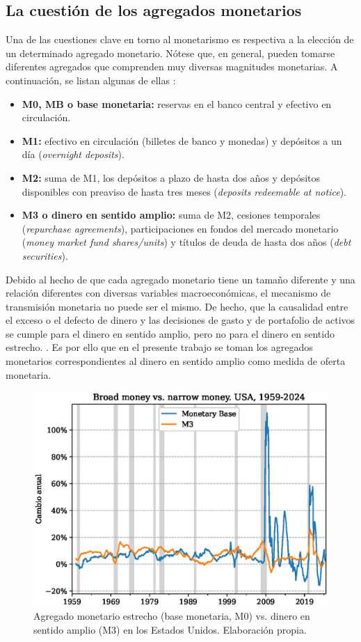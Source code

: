 \documentclass[titlepage, 12pt]{article}
\begin{document}
\subsection{La cuestión de los agregados monetarios}

Una de las cuestiones clave en torno al monetarismo es respectiva a la elección de un determinado agregado monetario. Nótese que, en general, pueden tomarse diferentes agregados que comprenden muy diversas magnitudes monetarias. A continuación, se listan algunas de ellas \autocite{oecd}:
\begin{itemize}
    \item \textbf{M0, MB o base monetaria:} reservas en el banco central y efectivo en circulación.
    \item \textbf{M1:} efectivo en circulación (billetes de banco y monedas) y depósitos a un día (\textit{overnight deposits}).
    \item  \textbf{M2:} suma de M1, los depósitos a plazo de hasta dos años y depósitos disponibles con preaviso de hasta tres meses (\textit{deposits redeemable at notice}).
    \item \textbf{M3 o dinero en sentido amplio:} suma de M2, cesiones temporales (\textit{repurchase agreements}), participaciones en fondos del mercado monetario (\textit{money market fund shares/units}) y títulos de deuda de hasta dos años (\textit{debt securities}).
\end{itemize}

Debido al hecho de que cada agregado monetario tiene un tamaño diferente y una relación diferentes con diversas variables macroeconómicas, el mecanismo de transmisión monetaria no puede ser el mismo. De hecho, que la causalidad entre el exceso o el defecto de dinero y las decisiones de gasto y de portafolio de activos se cumple para el dinero en sentido amplio, pero no para el dinero en sentido estrecho.  \autocite[137]{congdon2024}. Es por ello que en el presente trabajo se toman los agregados monetarios correspondientes al dinero en sentido amplio como medida de oferta monetaria.

\newpage
\begin{figure}
    \centering
    \includegraphics[width=.8\textwidth]{plots/broad-vs-narrow-money.eps}
    \caption{Agregado monetario estrecho (base monetaria, M0) vs. dinero en sentido amplio (M3) en los Estados Unidos. Elaboración propia.}
    \label{fig:broad-vs-narrow-money}
\end{figure}
\end{document}
